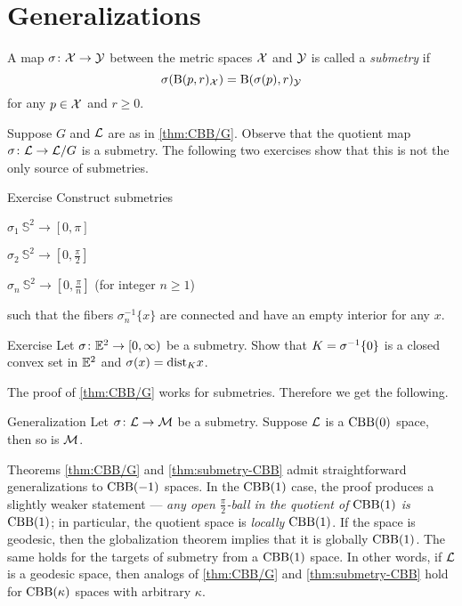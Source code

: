 \section{Generalizations}

A map $\sigma\colon\mathcal{X}\to\mathcal{Y}$ between the metric spaces $\mathcal{X}$ and $\mathcal{Y}$
is called a \emph{submetry} if 
\[\sigma(\mathrm{B}{}(p,r)_{\mathcal{X}})=\mathrm{B}{}(\sigma(p),r)_{\mathcal{Y}}\]
for any $p\in \mathcal{X}$ and $r\ge 0$.

Suppose $G$ and $\mathcal{L}$ are as in \ref{thm:CBB/G}.
Observe that the quotient map $\sigma\colon\mathcal{L}\to \mathcal{L}/G$ is a submetry.
The following two exercises show that this is not the only source of submetries. 

\begin{thm}{Exercise}\label{ex:sumbetries(S^2)}
Construct submetries
\begin{subthm}{}
$\sigma_1\:\mathbb{S}^2\to[0,\pi]$
\end{subthm}
\begin{subthm}{}
$\sigma_2\:\mathbb{S}^2\to[0,\tfrac\pi2]$
\end{subthm}
\begin{subthm}{}
$\sigma_n\:\mathbb{S}^2\to[0,\tfrac\pi n]$ (for integer $n\ge 1$)
\end{subthm}
such that the fibers $\sigma_n^{-1}\{x\}$ are connected and have an empty interior for any $x$.
\end{thm}

\begin{thm}{Exercise}
Let $\sigma\colon\mathbb{E}^2\to [0,\infty)$ be a submetry.
Show that $K\z=\sigma^{-1}\{0\}$ is a closed convex set in $\mathbb{E}^2$ and $\sigma(x)=\mathrm{dist}_Kx$.
\end{thm}

The proof of \ref{thm:CBB/G} works for submetries.
Therefore we get the following.

\begin{thm}{Generalization}\label{thm:submetry-CBB}
Let $\sigma\colon\mathcal{L}\to\mathcal{M}$ be a submetry.
Suppose $\mathcal{L}$ is a $\mathrm{CBB}(0)$ space, then so is $\mathcal{M}$.
\end{thm}

Theorems \ref{thm:CBB/G} and \ref{thm:submetry-CBB} admit straightforward generalizations to $\mathrm{CBB}(-1)$ spaces.
In the $\mathrm{CBB}(1)$ case, the proof produces a slightly weaker statement ---  \textit{any open $\tfrac\pi2$-ball in the quotient of $\mathrm{CBB}(1)$ is $\mathrm{CBB}(1)$};
in particular, the quotient space is \textit{locally} $\mathrm{CBB}(1)$.
If the space is geodesic, then the globalization theorem implies that it is globally  $\mathrm{CBB}(1)$.
The same holds for the targets of submetry from a  $\mathrm{CBB}(1)$ space.
In other words, if $\mathcal{L}$ is a geodesic space, then analogs of \ref{thm:CBB/G} and \ref{thm:submetry-CBB} hold for $\mathrm{CBB}(\kappa)$ spaces with arbitrary $\kappa$.


